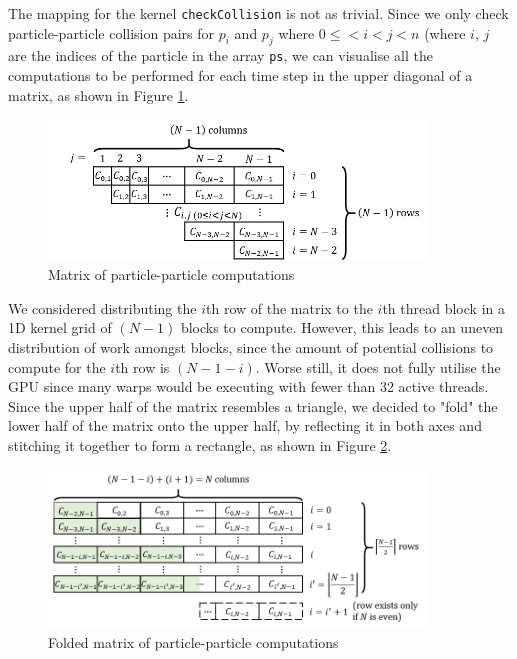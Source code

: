 \documentclass[12pt]{article}
\begin{document}
The mapping for the kernel \texttt{checkCollision} is not as trivial. Since we only check particle-particle collision pairs for $p_i$ and $p_j$ where $0\leq<i<j<n$ (where $i$, $j$ are the indices of the particle in the array \texttt{ps}, we can visualise all the computations to be performed for each time step in the upper diagonal of a matrix, as shown in Figure \ref{fig:collisionMatrix}.

\begin{figure}[H]
    \centering
    \includegraphics[width=0.9\textwidth]{reportAssets/chap3ppCollisionMatrix.png}
    \caption{Matrix of particle-particle computations}
    \label{fig:collisionMatrix}
\end{figure}

We considered distributing the $i$th row of the matrix to the $i$th thread block in a 1D kernel grid of $(N - 1)$ blocks to compute. However, this leads to an uneven distribution of work amongst blocks, since the amount of potential collisions to compute for the $i$th row is $(N - 1 - i)$. Worse still, it does not fully utilise the GPU since many warps would be executing with fewer than 32 active threads.\\

Since the upper half of the matrix resembles a triangle, we decided to "fold" the lower half of the matrix onto the upper half, by reflecting it in both axes and stitching it together to form a rectangle, as shown in Figure \ref{fig:collisionMatrixFolded}.

\begin{figure}[H]
    \centering
    \includegraphics[width=0.9\textwidth]{reportAssets/chap3ppCollisionMatrixFolded.png}
    \caption{Folded matrix of particle-particle computations}
    \label{fig:collisionMatrixFolded}
\end{figure}
\end{document}
